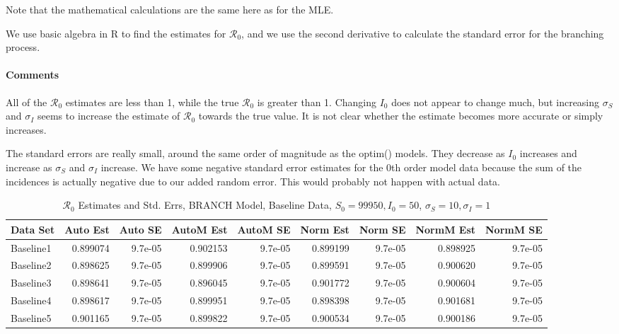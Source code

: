 \documentclass[12pt]{article}
\newcommand{\rr}{\ensuremath{\mathcal{R}_0}}
\begin{document}
Note that the mathematical calculations are the same here as for the MLE.

We use basic algebra in R to find the estimates for $\rr$, and we use the second derivative to calculate the standard error for the branching process.

\paragraph{Comments}

All of the $\rr$ estimates are less than 1, while the true $\rr$ is greater than 1. Changing $I_0$ does not appear to change much, but increasing $\sigma_S$ and $\sigma_I$ seems to increase the estimate of $\rr$ towards the true value. It is not clear whether the estimate becomes more accurate or simply increases.

The standard errors are really small, around the same order of magnitude as the optim() models. They decrease as $I_0$ increases and increase as $\sigma_S$ and $\sigma_I$ increase. We have some negative standard error estimates for the 0th order model data because the sum of the incidences is actually negative due to our added random error. This would probably not happen with actual data.

\begin{table}[H]
	
	\caption{$\rr$ Estimates and Std. Errs, BRANCH Model, 
		Baseline Data, $S_0 = 99950, I_0 = 50$, 
		$\sigma_S = 10, \sigma_I = 1$}
	\begin{footnotesize}
		\hskip -1cm
	\begin{tabular}{l|r|r|r|r|r|r|r|r}
		\hline
		Data Set & Auto Est & Auto SE & AutoM Est & AutoM SE & Norm Est & Norm SE & NormM Est & NormM SE\\
		\hline
		Baseline1 & 0.899074 & 9.7e-05 & 0.902153 & 9.7e-05 & 0.899199 & 9.7e-05 & 0.898925 & 9.7e-05\\
		\hline
		Baseline2 & 0.898625 & 9.7e-05 & 0.899906 & 9.7e-05 & 0.899591 & 9.7e-05 & 0.900620 & 9.7e-05\\
		\hline
		Baseline3 & 0.898641 & 9.7e-05 & 0.896045 & 9.7e-05 & 0.901772 & 9.7e-05 & 0.900604 & 9.7e-05\\
		\hline
		Baseline4 & 0.898617 & 9.7e-05 & 0.899951 & 9.7e-05 & 0.898398 & 9.7e-05 & 0.901681 & 9.7e-05\\
		\hline
		Baseline5 & 0.901165 & 9.7e-05 & 0.899822 & 9.7e-05 & 0.900534 & 9.7e-05 & 0.900186 & 9.7e-05\\
		\hline
	\end{tabular}
\end{footnotesize}
\end{table}
\end{document}
